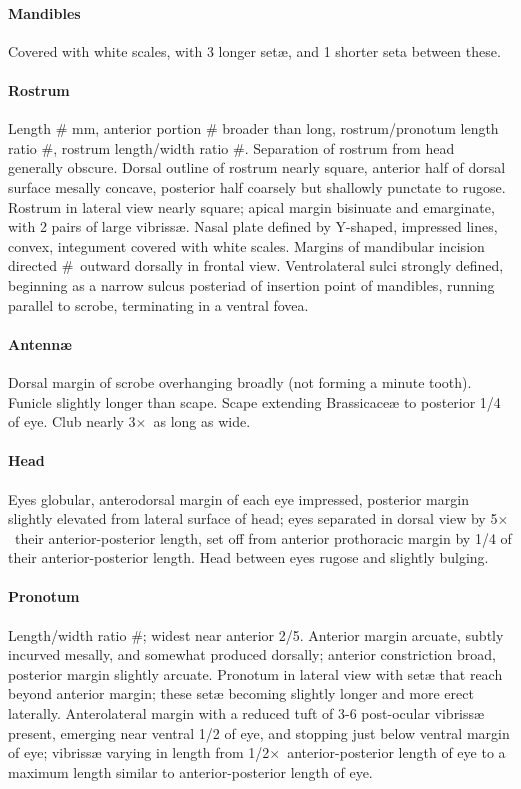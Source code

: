 \documentclass[fleqn,10pt,lineno]{wlpeerj} %
\newcommand{\td}{\textdegree~}
\newcommand{\x}{$\times$~}
\begin{document}
			\paragraph{Mandibles}
				Covered with white scales, with 3 longer set{\ae}, and 1 shorter seta between these.
			\paragraph{Rostrum}
				Length \# mm, anterior portion \# broader than long, rostrum/pronotum length ratio \#, rostrum length/width ratio \#.
				Separation of rostrum from head generally obscure. 
				Dorsal outline of rostrum nearly square, anterior half of dorsal surface mesally concave, posterior half coarsely but shallowly punctate to rugose. 
				Rostrum in lateral view nearly square; apical margin bisinuate and emarginate, with 2 pairs of large vibriss{\ae}. 
				Nasal plate defined by Y-shaped, impressed lines, convex, integument covered with white scales.
				Margins of mandibular incision directed \#\td outward dorsally in frontal view. 
				Ventrolateral sulci strongly defined, beginning as a narrow sulcus posteriad of insertion point of mandibles, running parallel to scrobe, terminating in a ventral fovea.
			\paragraph{Antenn{\ae}}
				Dorsal margin of scrobe overhanging broadly (not forming a minute tooth).
				Funicle slightly longer than scape.
				Scape extending Brassicace{\ae}  to posterior 1/4 of eye.
				Club nearly 3\x as long as wide.
			\paragraph{Head}
				Eyes globular, anterodorsal margin of each eye impressed, posterior margin slightly elevated from lateral surface of head; eyes separated in dorsal view by 5\x their anterior-posterior length, set off from anterior prothoracic margin by 1/4 of their anterior-posterior length.
				Head between eyes rugose and slightly bulging.
			\paragraph{Pronotum}
				Length/width ratio \#; widest near anterior 2/5.
				Anterior margin arcuate, subtly incurved mesally, and somewhat produced dorsally; anterior constriction broad, posterior margin slightly arcuate.
				Pronotum in lateral view with set{\ae} that reach beyond anterior margin; these set{\ae} becoming slightly longer and more erect laterally.
				Anterolateral margin with a reduced tuft of 3-6 post-ocular vibriss{\ae} present, emerging near ventral 1/2 of eye, and stopping just below ventral margin of eye; vibriss{\ae} varying in length from 1/2\x anterior-posterior length of eye to a maximum length similar to anterior-posterior length of eye.
\end{document}

